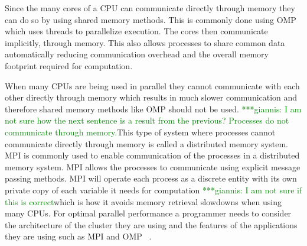\documentclass[preprint,11pt,authoryear]{elsarticle}
\newcommand{\gpnote}[1]{{\textcolor{green} {***giannis: #1}}}
\newcommand{\gpnote}[1]{}
\begin{document}
Since the many cores of a CPU can communicate directly through memory they can 
do so by using shared memory methods. This is commonly done using OMP 
which uses threads to parallelize execution. 
The cores then communicate implicitly, through memory. 
This also allows processes to share common data automatically reducing 
communication overhead and the overall memory footprint required 
for computation.

When many CPUs are being used in parallel they cannot communicate with each 
other directly through memory which results in much slower communication and 
therefore shared memory methods like OMP should not be used. \gpnote{I am not sure
    how the next sentence is a result from the previous? Processes do not communicate
through memory.}This type of 
system where processes cannot communicate directly through memory is called a 
distributed memory system. MPI is commonly used to enable communication 
of the processes in a distributed memory system. MPI allows the processes 
to communicate using explicit  message passing methods. MPI will operate 
each process as a discrete entity with its own private copy of 
each variable it needs for computation \gpnote{I am not sure if this is correct}which is how it avoids memory retrieval 
slowdowns when using many CPUs. For optimal parallel performance a programmer 
needs to consider the architecture of the cluster they are using and the 
features of the applications they are using such as MPI and OMP ~\citep{Adhianto2007}.  


\end{document}
